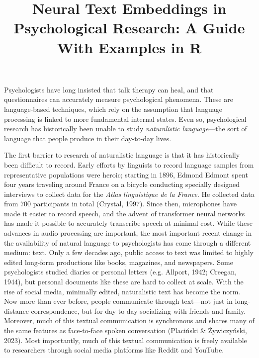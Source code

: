 \documentclass[
  man,
  floatsintext,
  longtable,
  nolmodern,
  notxfonts,
  notimes,
  colorlinks=true,linkcolor=blue,citecolor=blue,urlcolor=blue]{apa7}
\title{Neural Text Embeddings in Psychological Research: A Guide With
Examples in R}
\affiliation{
{Department of Psychology, Ben-Gurion University of the Negev}}
\begin{document}
\maketitle


\setcounter{secnumdepth}{-\maxdimen} %

\setlength\LTleft{0pt}


Psychologists have long insisted that talk therapy can heal, and that
questionnaires can accurately measure psychological phenomena. These are
language-based techniques, which rely on the assumption that language
processing is linked to more fundamental internal states. Even so,
psychological research has historically been unable to study
\emph{naturalistic language}---the sort of language that people produce
in their day-to-day lives.

The first barrier to research of naturalistic language is that it has
historically been difficult to record. Early efforts by linguists to
record language samples from representative populations were heroic;
starting in 1896, Edmond Edmont spent four years traveling around France
on a bicycle conducting specially designed interviews to collect data
for the \emph{Atlas linguistique de la France}. He collected data from
700 participants in total (Crystal, 1997). Since then, microphones have
made it easier to record speech, and the advent of transformer neural
networks has made it possible to accurately transcribe speech at minimal
cost. While these advances in audio processing are important, the most
important recent change in the availability of natural language to
psychologists has come through a different medium: text. Only a few
decades ago, public access to text was limited to highly edited
long-form productions like books, magazines, and newspapers. Some
psychologists studied diaries or personal letters (e.g. Allport, 1942;
Creegan, 1944), but personal documents like these are hard to collect at
scale. With the rise of social media, minimally edited, naturalistic
text has become the norm. Now more than ever before, people communicate
through text---not just in long-distance correspondence, but for
day-to-day socializing with friends and family. Moreover, much of this
textual communication is synchronous and shares many of the same
features as face-to-face spoken conversation (Placiński \& Żywiczyński,
2023). Most importantly, much of this textual communication is freely
available to researchers through social media platforms like Reddit and
YouTube.
\end{document}
